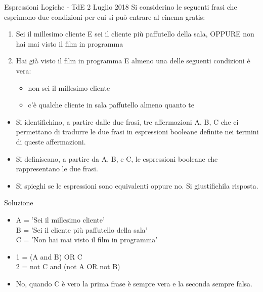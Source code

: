 \documentclass[aspectratio=169,]{beamer}
\begin{document}
\begin{frame}[allowframebreaks]{Espressioni Logiche - TdE 2 Luglio 2018}
    Si considerino le seguenti frasi che esprimono due condizioni per cui si può entrare al cinema gratis:
    \begin{enumerate}
        \item Sei il millesimo cliente E sei il cliente più paffutello della sala, OPPURE non hai mai visto il film in programma
        \item Hai già visto il film in programma E almeno una delle seguenti condizioni è vera:
            \begin{itemize}
                \item non sei il millesimo cliente
                \item c’è qualche cliente in sala paffutello almeno quanto te
            \end{itemize}
    \end{enumerate}

    \begin{itemize}
        \item Si identifichino, a partire dalle due frasi, tre affermazioni A, B, C che ci permettano di tradurre le due
            frasi in espressioni booleane definite nei termini di queste affermazioni.
        \item Si definiscano, a partire da A, B, e C, le espressioni booleane che rappresentano le due frasi.
        \item Si spieghi se le espressioni sono equivalenti oppure no. Si giustifichila risposta.
    \end{itemize}
\end{frame}

\begin{frame}{Soluzione}
    \begin{itemize}
        \item A = 'Sei il millesimo cliente' \\
            B = 'Sei il cliente più paffutello della sala' \\
            C = 'Non hai mai visto il film in programma'
        \item 1 = (A and B) OR C \\
            2 = not C and (not A OR not B)
        \item No, quando C è vero la prima frase è sempre vera e la seconda sempre falsa.
    \end{itemize}
\end{frame}
\end{document}

